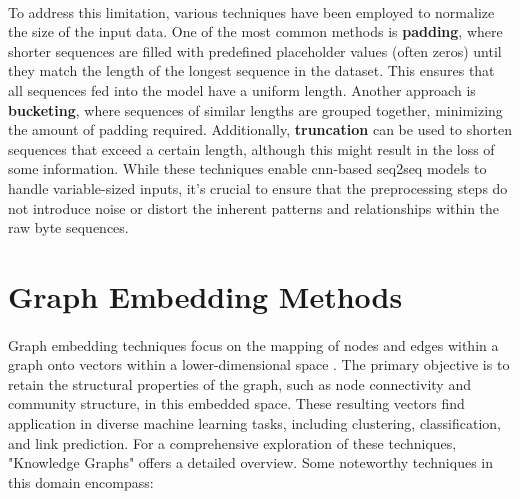         \paragraph{}To address this limitation, various techniques have been employed to normalize the size of the input data. One of the most common methods is \textbf{padding}, where shorter sequences are filled with predefined placeholder values (often zeros) until they match the length of the longest sequence in the dataset. This ensures that all sequences fed into the model have a uniform length. Another approach is \textbf{bucketing}, where sequences of similar lengths are grouped together, minimizing the amount of padding required. Additionally, \textbf{truncation} can be used to shorten sequences that exceed a certain length, although this might result in the loss of some information. While these techniques enable \acrshort{cnn}-based \acrfull{seq2seq} models to handle variable-sized inputs, it's crucial to ensure that the preprocessing steps do not introduce noise or distort the inherent patterns and relationships within the raw byte sequences.
\section{Graph Embedding Methods}
    \paragraph{}Graph embedding techniques focus on the mapping of nodes and edges within a graph onto vectors within a lower-dimensional space \cite{hogan_knowledge_2022}. The primary objective is to retain the structural properties of the graph, such as node connectivity and community structure, in this embedded space. These resulting vectors find application in diverse machine learning tasks, including clustering, classification, and link prediction. For a comprehensive exploration of these techniques, "Knowledge Graphs" offers a detailed overview. Some noteworthy techniques in this domain encompass:

